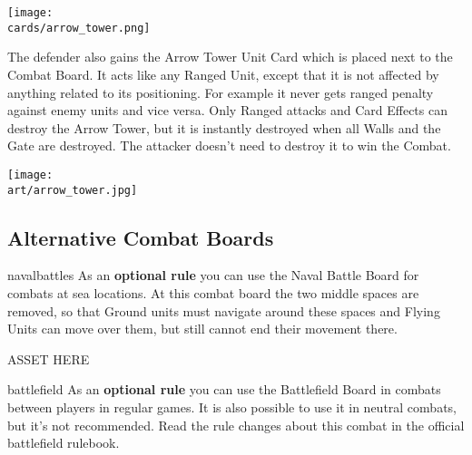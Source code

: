 \begin{multicols}{2}
\begin{center}
  \texttt{[image: \\cards/arrow\_tower.png]}
\end{center}
The defender also gains the Arrow Tower Unit Card which is placed next to the Combat Board.
It acts like any Ranged  Unit, except that it is not affected by anything related to its positioning.
For example it never gets ranged penalty against enemy units and vice versa.
Only Ranged attacks and Card Effects can destroy the Arrow Tower, but it is instantly destroyed when all Walls and the Gate are destroyed.
The attacker doesn't need to destroy it to win the Combat.

\vspace{1em}

\begin{center}
  \texttt{[image: \\art/arrow\_tower.jpg]}
\end{center}

\newpage

\subsection*{Alternative Combat Boards}
\begin{expansion}{navalbattles}
  As an \textbf{optional rule} you can use the Naval Battle Board for combats at sea locations. At this combat board the two middle spaces are removed, so that Ground  units must navigate around these spaces and Flying  Units can move over them, but still cannot end their movement there.

  ASSET HERE
\end{expansion}

\begin{expansion}{battlefield}
  As an \textbf{optional rule} you can use the Battlefield Board in combats between players in regular games.
  It is also possible to use it in neutral combats, but it's not recommended.
  Read the rule changes about this combat in the official battlefield rulebook.
\end{expansion}

\end{multicols}
